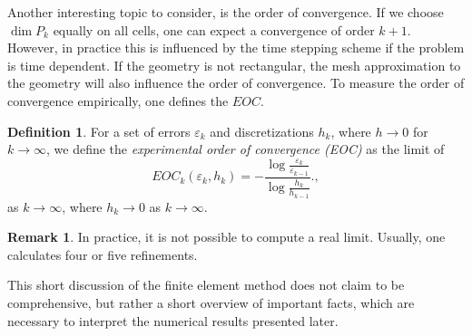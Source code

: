 \documentclass[12pt,a4paper,twoside, open=right]{scrreprt}
\theoremstyle{definition}
\newtheorem{rem}[auf]{Remark}
\newtheorem{defn}[auf]{Definition}
\theoremstyle{plain}
\begin{document}
Another interesting topic to consider, is the order of convergence. If we choose $\dim P_k$ equally on all cells, one can expect a convergence of order $k+1$. However, in practice this is influenced by the time stepping scheme if the problem is time dependent. If the geometry is not rectangular, the mesh approximation to the geometry will also influence the order of convergence. To measure the order of convergence empirically, one defines the $EOC$.
\begin{defn}
    For a set of errors $\varepsilon_k$ and discretizations $h_k$, where $h\to 0$ for $k\to\infty$, we define the \emph{experimental order of convergence (EOC)} as the limit of 
    \begin{equation}
        EOC_k(\varepsilon_k,h_k)=-\frac{\log\frac{\varepsilon_k}{\varepsilon_{k-1}}}{\log{\frac{h_k}{h_{k-1}}}}.\label{eq:EOC},
    \end{equation} 
    as $k\to\infty$, where $h_k\to 0$ as $k\to\infty$.
\end{defn}
\begin{rem}
    In practice, it is not possible to compute a real limit. Usually, one calculates four or five refinements.
\end{rem}
This short discussion of the finite element method does not claim to be comprehensive, but rather a short overview of important facts, which are necessary to interpret the numerical results presented later.  
\end{document}
